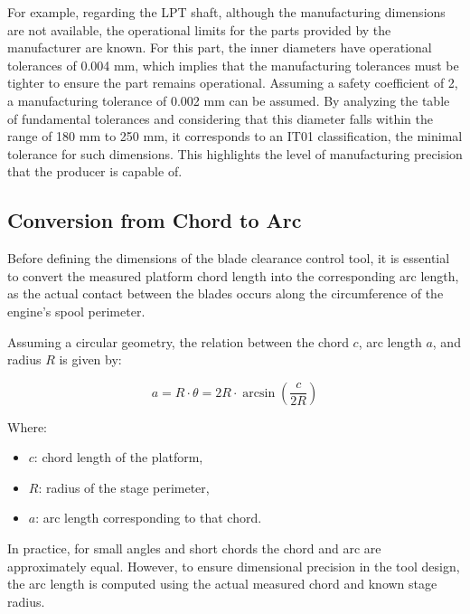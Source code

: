 For example, regarding the \gls{LPT} shaft, although the manufacturing dimensions are not available, the operational limits for the parts provided by the manufacturer are known. 
For this part, the inner diameters have operational tolerances of 0.004 mm, which implies that the manufacturing tolerances must be tighter to ensure the part remains operational. 
Assuming a safety coefficient of 2, a manufacturing tolerance of 0.002 mm can be assumed. 
By analyzing the table of fundamental tolerances and considering that this diameter falls within the range of 180 mm to 250 mm, it corresponds to an IT01 classification, the minimal tolerance for such dimensions. 
This highlights the level of manufacturing precision that the producer is capable of.


\subsection{Conversion from Chord to Arc}

Before defining the dimensions of the blade clearance control tool, it is essential to convert the measured platform chord length into the corresponding arc length, as the actual contact between the blades occurs along the circumference of the engine's spool perimeter.

Assuming a circular geometry, the relation between the chord \(c\), arc length \(a\), and radius \(R\) is given by:

\[
a = R \cdot \theta = 2R \cdot \arcsin\left( \frac{c}{2R} \right)
\]

Where:
\begin{itemize}
    \item \(c\): chord length of the platform,
    \item \(R\): radius of the stage perimeter,
    \item \(a\): arc length corresponding to that chord.
\end{itemize}

In practice, for small angles and short chords the chord and arc are approximately equal. 
However, to ensure dimensional precision in the tool design, the arc length is computed using the actual measured chord and known stage radius.

